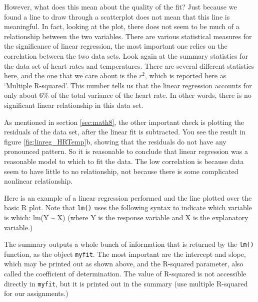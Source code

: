 \documentclass[
  letterpaper,
  DIV=11,
  numbers=noendperiod]{scrreprt}
\newenvironment{Shaded}{\begin{snugshade}}{\end{snugshade}}
\newcommand{\NormalTok}[1]{\textcolor[rgb]{0.00,0.23,0.31}{#1}}
\begin{document}
However, what does this mean about the quality of the fit? Just because
we found a line to draw through a scatterplot does not mean that this
line is meaningful. In fact, looking at the plot, there does not seem to
be much of a relationship between the two variables. There are various
statistical measures for the significance of linear regression, the most
important one relies on the correlation between the two data sets. Look
again at the summary statistics for the data set of heart rates and
temperatures. There are several different statistics here, and the one
that we care about is the \(r^2\), which is reported here as `Multiple
R-squared'. This number tells us that the linear regression accounts for
only about 6\% of the total variance of the heart rate. In other words,
there is no significant linear relationship in this data set.

As mentioned in section \ref{sec:math8}, the other important check is
plotting the residuals of the data set, after the linear fit is
subtracted. You see the result in figure \ref{fig:linreg_HRTemp}b,
showing that the residuals do not have any pronounced pattern. So it is
reasonable to conclude that linear regression was a reasonable model to
which to fit the data. The low correlation is because data seem to have
little to no relationship, not because there is some complicated
nonlinear relationship.

Here is an example of a linear regression performed and the line plotted
over the basic R plot. Note that \texttt{lm()} uses the following syntax
to indicate which variable is which: lm(Y \textasciitilde{} X) (where Y
is the response variable and X is the explanatory variable.)

\begin{Shaded}
\end{Shaded}

The summary outputs a whole bunch of information that is returned by the
\texttt{lm()} function, as the object \texttt{myfit}. The most important
are the intercept and slope, which may be printed out as shown above,
and the R-squared parameter, also called the coefficient of
determination. The value of R-squared is not accessible directly in
\texttt{myfit}, but it is printed out in the summary (use multiple
R-squared for our assignments.)
\end{document}
